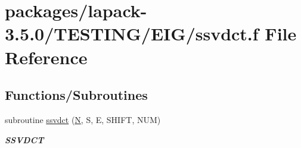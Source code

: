\hypertarget{ssvdct_8f}{}\section{packages/lapack-\/3.5.0/\+T\+E\+S\+T\+I\+N\+G/\+E\+I\+G/ssvdct.f File Reference}
\label{ssvdct_8f}
\subsection*{Functions/\+Subroutines}
\begin{DoxyCompactItemize}
\item 
subroutine \hyperlink{group__single__eig_ga1f89a00fd5baa9f3d801169211b98930}{ssvdct} (\hyperlink{polmisc_8c_a0240ac851181b84ac374872dc5434ee4}{N}, S, E, S\+H\+I\+F\+T, N\+U\+M)
\begin{DoxyCompactList}\small\item\em {\bfseries S\+S\+V\+D\+C\+T} \end{DoxyCompactList}\end{DoxyCompactItemize}
